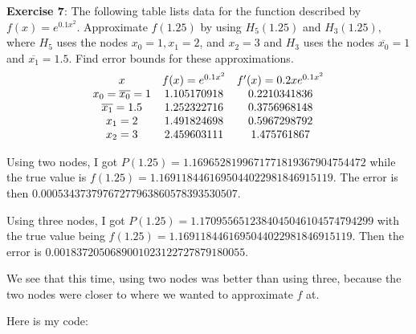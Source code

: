 \documentclass{article}
\begin{document}
\textbf{Exercise 7}: The following table lists data for the function described by $f(x) = e^{0.1x^{2}}$. Approximate $f(1.25)$ by using $H_{5}(1.25)$ and $H_{3}(1.25)$, where $H_{5}$ uses the nodes $x_{0} = 1, x_{1} =2 $, and $x_{2} = 3$ and $H_{3}$ uses the nodes $\overline{x_{0}} = 1$ and $\overline{x_{1}} = 1.5$. Find error bounds for these approximations.
    \begin{align*}
        \begin{array}{ c c c }
            x                            & f(x) = e^{0.1x^{2}} & f^{\prime}(x) = 0.2xe^{0.1x^{2}} \\
            x_{0} = \overline{x_{0}} = 1 & 1.105170918         & 0.2210341836                     \\
            \overline{x_{1}} = 1.5       & 1.252322716         & 0.3756968148                     \\
            x_{1} = 2                    & 1.491824698         & 0.5967298792                     \\
            x_{2} = 3                    & 2.459603111         & 1.475761867                        
        \end{array}
    \end{align*}
        \begin{answer}
            Using two nodes, I got $P(1.25) = 1.1696528199671771819367904754472$ while the true value is $f(1.25) = 1.1691184461695044022981846915119$. The error is then $0.00053437379767277963860578393530507$.

            Using three nodes, I got $P(1.25) = 1.1709556512384045046104574794299$ with the true value being $f(1.25) = 1.1691184461695044022981846915119$. Then the error is $0.0018372050689001023122727879180055$.

            We see that this time, using two nodes was better than using three, because the two nodes were closer to where we wanted to approximate $f$ at.

            Here is my code:
            \inputminted{matlab}{./code/Hermite/Hermite.m}
            \inputminted{matlab}{./code/Hermite/forwardPoly.m}
            \inputminted{matlab}{./code/script3.m}
            \inputminted{matlab}{./code/script4.m}
        \end{answer}
\end{document}
